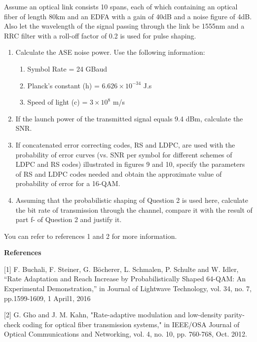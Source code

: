 \documentclass[10pt,letterpaper]{article}
\begin{document}
Assume an optical link consists 10 spans, each of which containing an optical fiber of length 80km and an EDFA with a gain of 40dB and a noise figure of 4dB. Also let the wavelength of the signal passing through the link be 1555nm and a RRC filter with a roll-off factor of 0.2 is used for pulse shaping.
\begin{enumerate}[label=\alph*-]
\item
Calculate the ASE noise power. Use the following information:
\begin{enumerate}[label=$\bullet$]
\item
Symbol Rate = 24 GBaud
\item
Planck's constant (h) = $6.626 \times 10 ^ {-34}$ J.s
\item
Speed of light (c) = $3\times10 ^ {8}$ m/s    
\end{enumerate}
\item
If the launch power of the transmitted signal equals 9.4 dBm, calculate the SNR.
\item
If concatenated error correcting codes, RS and LDPC, are used with the probability of error curves (vs. SNR per symbol for different schemes of LDPC and RS codes) illustrated in figures 9 and 10, specify the parameters of RS and LDPC codes needed and obtain the approximate value of probability of error for a 16-QAM.
\item
Assuming that the probabilistic shaping of Question 2 is used here, calculate the bit rate of transmission through the channel, compare it with the result of part f- of Question 2 and justify it.
\end{enumerate}
You can refer to references 1 and 2 for more information.


\newpage
\textbf{References}

[1] F. Buchali, F. Steiner, G. Böcherer, L. Schmalen, P. Schulte and W. Idler, “Rate   Adaptation and Reach Increase by Probabilistically Shaped 64-QAM: An Experimental Demonstration,” in Journal of Lightwave Technology, vol. 34, no. 7, pp.1599-1609, 1 April1, 2016

[2] G. Gho and J. M. Kahn, "Rate-adaptive modulation and low-density parity-check coding for  optical fiber transmission systems," in IEEE/OSA Journal of Optical Communications and Networking, vol. 4, no. 10, pp. 760-768, Oct. 2012.
\end{document}
